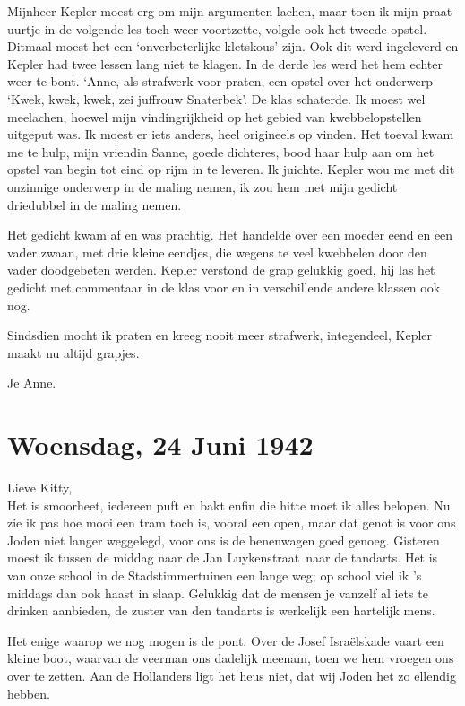 \documentclass{book}
\begin{document}
Mijnheer Kepler moest erg om mijn argumenten lachen, maar toen ik mijn
praat-uurtje in de volgende les toch weer voortzette, volgde ook het tweede
opstel. Ditmaal moest het een `onverbeterlijke kletskous' zijn.  Ook dit werd
ingeleverd en Kepler had twee lessen lang niet te klagen.  In de derde les werd
het hem echter weer te bont. `Anne, als strafwerk voor praten, een opstel over
het onderwerp `Kwek, kwek, kwek, zei juffrouw Snaterbek'. De klas schaterde. Ik
moest wel meelachen, hoewel mijn vindingrijkheid op het gebied van
kwebbelopstellen uitgeput was. Ik moest er iets anders, heel origineels op
vinden. Het toeval kwam me te hulp, mijn vriendin Sanne, goede dichteres, bood
haar hulp aan om het opstel van begin tot eind op rijm in te leveren. Ik
juichte. Kepler wou me met dit onzinnige onderwerp in de maling nemen, ik zou
hem met mijn gedicht driedubbel in de maling nemen.

Het gedicht kwam af en was prachtig. Het handelde over een moeder eend en een
vader zwaan, met drie kleine eendjes, die wegens te veel kwebbelen door den
vader doodgebeten werden. Kepler verstond de grap gelukkig goed, hij las het
gedicht met commentaar in de klas voor en in verschillende andere klassen ook
nog.

Sindsdien mocht ik praten en kreeg nooit meer strafwerk, integendeel, Kepler
maakt nu altijd grapjes.

Je Anne.

\section*{Woensdag, 24 Juni 1942}

Lieve Kitty,\\
Het is smoorheet, iedereen puft en bakt enfin die hitte moet ik
alles belopen. Nu zie ik pas hoe mooi een tram toch is, vooral een open, maar
dat genot is voor ons Joden niet langer weggelegd, voor ons is de benenwagen
goed genoeg. Gisteren moest ik tussen de middag naar de Jan Luykenstraat~naar de
tandarts. Het is van onze school in de Stadstimmertuinen een lange weg; op
school viel ik 's middags dan ook haast in slaap. Gelukkig dat de mensen je
vanzelf al iets te drinken aanbieden, de zuster van den tandarts is werkelijk
een hartelijk mens.

Het enige waarop we nog mogen is de pont. Over de Josef Israëlskade vaart een
kleine boot, waarvan de veerman ons dadelijk meenam, toen we hem vroegen ons
over te zetten. Aan de Hollanders ligt het heus niet, dat wij Joden het zo
ellendig hebben.
\end{document}
